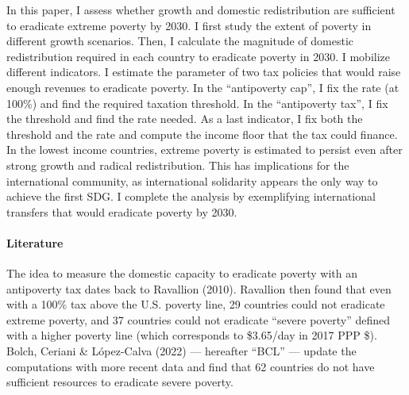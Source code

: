 In this paper, I assess whether growth and domestic redistribution are sufficient to eradicate extreme poverty by 2030. I first study the extent of poverty in different growth scenarios. Then, I calculate the magnitude of domestic redistribution required in each country to eradicate poverty in 2030. I mobilize different indicators. I estimate the parameter of two tax policies that would raise enough revenues to eradicate poverty. In the ``antipoverty cap'', I fix the rate (at 100\%) and find the required taxation threshold. In the ``antipoverty tax'', I fix the threshold and find the rate needed. As a last indicator, I fix both the threshold and the rate and compute the income floor that the tax could finance. In the lowest income countries, extreme poverty is estimated to persist even after strong growth and radical redistribution. %
This has implications for the international community, as international solidarity appears %
the only way to achieve the first SDG. I complete the analysis by exemplifying international transfers that would eradicate poverty by 2030.

\paragraph{Literature} 

The idea to measure the domestic capacity to eradicate poverty with an antipoverty tax dates back to Ravallion (2010).\cite{ravallion_poorer_2010,ceriani_income_2014} Ravallion then found that even with a 100\% tax above the U.S. poverty line, 29 countries could not eradicate extreme poverty, and 37 countries could not eradicate ``severe poverty'' defined with a higher poverty line (which corresponds to \$3.65/day in 2017 PPP \$). %
Bolch, Ceriani \& López-Calva (2022) --- hereafter ``BCL'' --- update the computations with more recent data and find that 62 countries do not have sufficient resources to eradicate severe poverty.\cite{bolch_arithmetics_2022} %


